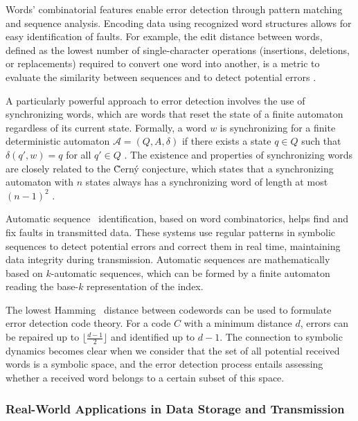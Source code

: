 \documentclass[12pt,a4paper]{article}
\begin{document}
Words' combinatorial features enable error detection through pattern matching and sequence analysis.  Encoding data using recognized word structures allows for easy identification of faults.  For example, the edit distance between words, defined as the lowest number of single-character operations (insertions, deletions, or replacements) required to convert one word into another, is a metric to evaluate the similarity between sequences and to detect potential errors \cite{Levenshtein}.

A particularly powerful approach to error detection involves the use of synchronizing words, which are words that reset the state of a finite automaton regardless of its current state. Formally, a word $w$ is synchronizing for a finite deterministic automaton $\mathcal{A} = (Q, A, \delta)$ if there exists a state $q \in Q$ such that $\delta(q', w) = q$ for all $q' \in Q$ \cite{Perrin2001}. The existence and properties of synchronizing words are closely related to the \~{C}ern\'y conjecture, which states that a synchronizing automaton with $n$ states always has a synchronizing word of length at most $(n-1)^2$ \cite{Cerny}.

Automatic sequence~\cite{Allouche} identification, based on word combinatorics, helps find and fix faults in transmitted data.  These systems use regular patterns in symbolic sequences to detect potential errors and correct them in real time, maintaining data integrity during transmission.  Automatic sequences are mathematically based on $k$-automatic sequences, which can be formed by a finite automaton reading the base-$k$ representation of the index.

The lowest Hamming~\cite{MacWilliams} distance between codewords can be used to formulate error detection code theory.  For a code $C$ with a minimum distance $d$, errors can be repaired up to $\lfloor\frac{d-1}{2}\rfloor$ and identified up to $d-1$.  The connection to symbolic dynamics becomes clear when we consider that the set of all potential received words is a symbolic space, and the error detection process entails assessing whether a received word belongs to a certain subset of this space.
\subsubsection{Real-World Applications in Data Storage and Transmission}
\end{document}
